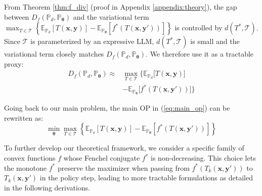 From Theorem \ref{thm:f_div} (proof in Appendix \ref{appendix:theory}), the gap between $D_{f}\left(\mathbb{P}_d,\mathbb{P}_{\boldsymbol{\theta}}\right)$ and the variational term $\max_{T\in\mathcal{T}}\left\{ \mathbb{E}_{\mathbb{P}_d}\left[T\left(\boldsymbol{x},\boldsymbol{y}\right)\right]-\mathbb{E}_{\mathbb{P}_{\boldsymbol{\theta}}}\left[f^{*}\left(T\left(\boldsymbol{x},\boldsymbol{y}'\right)\right)\right]\right\}$ is controlled by $d(T^*, \mathcal{T})$. Since $\mathcal{T}$ is parameterized by an expressive LLM, $d(T^*, \mathcal{T})$ is small and the variational term closely matches $D_{f}\left(\mathbb{P}_d,\mathbb{P}_{\boldsymbol{\theta}}\right)$. We therefore use it as a tractable proxy:
\begin{equation}
\label{eq:D_f}
\begin{split}
D_{f}(\mathbb{P}_d,\mathbb{P}_{\boldsymbol{\theta}}) \approx  & \max_{T\in\mathcal{T}} \bigg\{ \mathbb{E}_{\mathbb{P}_d}\big[T(\boldsymbol{x},\boldsymbol{y})\big] \\
& - \mathbb{E}_{\mathbb{P}_{\boldsymbol{\theta}}}\big[f^{*}(T(\boldsymbol{x},\boldsymbol{y}'))\big] \bigg\}
\end{split}
\end{equation}

Going back to our main problem, the main OP in (\ref{eq:main_op}) can be rewritten as:
\begin{equation}
\min_{\boldsymbol{\theta}}\max_{T\in\mathcal{T}}\left\{ \mathbb{E}_{\mathbb{P}_{d}}\left[T\left(\boldsymbol{x},\boldsymbol{y}\right)\right]-\mathbb{E}_{\mathbb{P}_{\boldsymbol{\theta}}}\left[f^{*}\left(T\left(\boldsymbol{x},\boldsymbol{y}'\right)\right)\right]\right\}\label{eq:derived_op}
\end{equation}

To further develop our theoretical framework, we consider a specific family of convex functions $f$ whose Fenchel conjugate $f^*$ is non-decreasing. This choice lets the monotone $f^*$ preserve the maximizer when passing from $f^*(T_k(\boldsymbol{x},\boldsymbol{y}'))$ to $T_k(\boldsymbol{x},\boldsymbol{y}')$ in the policy step, leading to more tractable formulations as detailed in the following derivations.

